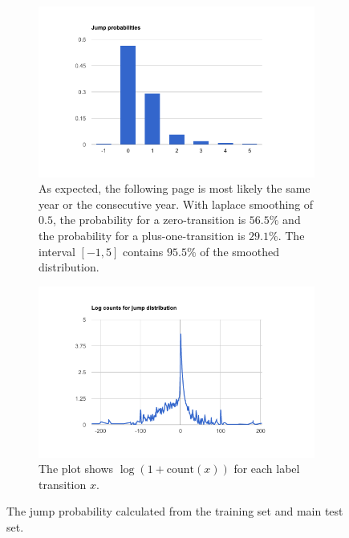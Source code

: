 
\begin{figure}
    \centering
    \begin{subfigure}[c]{1.0\textwidth}
        \centering        \includegraphics[scale=0.7]{resources/jump_distribution.png}
        \caption{As expected, the following page is most likely the same year or the consecutive year. With laplace smoothing of $0.5$, the probability for a zero-transition is $56.5\%$ and the probability for a plus-one-transition is $29.1\%$. The interval $[-1,5]$ contains $95.5\%$ of the smoothed distribution.}
        \label{fig:jump_prob}
    \end{subfigure}
    \begin{subfigure}[c]{1.0\textwidth}
        \centering
        \includegraphics[scale=0.7]{resources/jump_log_counts.png}
        \caption{The plot shows $\log(1+\text{count}(x))$ for each label transition $x$.}
        \label{fig:jump_log_counts}
    \end{subfigure}
    \caption{The jump probability calculated from the training set and main test set.}
\end{figure}
